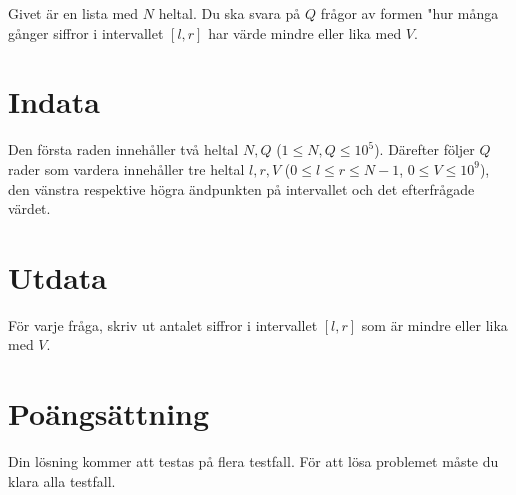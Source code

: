Givet är en lista med $N$ heltal. Du ska svara på $Q$ frågor av formen "hur många gånger siffror
i intervallet $[l,r]$ har värde mindre eller lika med $V$.

\section*{Indata}
Den första raden innehåller två heltal $N,Q$ ($1 \leq N,Q \leq 10^5$).
Därefter följer $Q$ rader som vardera innehåller tre heltal $l, r, V$ ($0 \leq l \leq r \leq N-1$, $0 \leq V \leq 10^9$),
den vänstra respektive högra ändpunkten på intervallet och det efterfrågade värdet.

\section*{Utdata}
För varje fråga, skriv ut antalet siffror i intervallet $[l,r]$ som är mindre eller lika med $V$.

\section*{Poängsättning}
Din lösning kommer att testas på flera testfall.
\noindent
För att lösa problemet måste du klara alla testfall.
